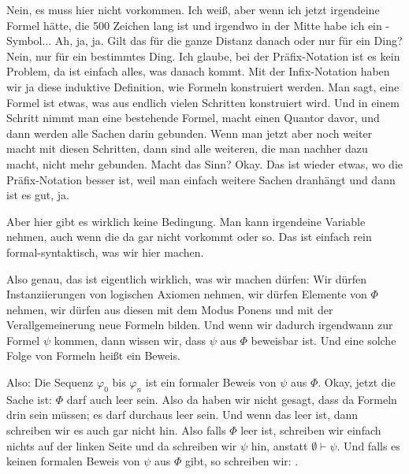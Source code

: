 \begin{spoken-clean}[00:22:30 - 00:24:45]
Nein, es muss hier nicht vorkommen. Ich weiß, aber wenn ich jetzt irgendeine Formel hätte, die 500 Zeichen lang ist und irgendwo in der Mitte habe ich ein -Symbol... Ah, ja, ja. Gilt das für die ganze Distanz danach oder nur für ein Ding? Nein, nur für ein bestimmtes Ding. Ich glaube, bei der Präfix-Notation ist es kein Problem, da ist einfach alles, was danach kommt. Mit der Infix-Notation haben wir ja diese induktive Definition, wie Formeln konstruiert werden. Man sagt, eine Formel ist etwas, was aus endlich vielen Schritten konstruiert wird. Und in einem Schritt nimmt man eine bestehende Formel, macht einen Quantor davor, und dann werden alle Sachen darin gebunden. Wenn man jetzt aber noch weiter macht mit diesen Schritten, dann sind alle weiteren, die man nachher dazu macht, nicht mehr gebunden. Macht das Sinn? Okay. Das ist wieder etwas, wo die Präfix-Notation besser ist, weil man einfach weitere Sachen dranhängt und dann ist es gut, ja.

Aber hier gibt es wirklich keine Bedingung. Man kann irgendeine Variable nehmen, auch wenn die da gar nicht vorkommt oder so. Das ist einfach rein formal-syntaktisch, was wir hier machen.

Also genau, das ist eigentlich wirklich, was wir machen dürfen: Wir dürfen Instanziierungen von logischen Axiomen nehmen, wir dürfen Elemente von $\Phi$ nehmen, wir dürfen aus diesen mit dem Modus Ponens und mit der Verallgemeinerung neue Formeln bilden. Und wenn wir dadurch irgendwann zur Formel $\psi$ kommen, dann wissen wir, dass $\psi$ aus $\Phi$ beweisbar ist. Und eine solche Folge von Formeln heißt ein Beweis.

Also: Die Sequenz $\varphi_0$ bis $\varphi_n$ ist ein formaler Beweis von $\psi$ aus $\Phi$. Okay, jetzt die Sache ist: $\Phi$ darf auch leer sein. Also da haben wir nicht gesagt, dass da Formeln drin sein müssen; es darf durchaus leer sein. Und wenn das leer ist, dann schreiben wir es auch gar nicht hin. Also falls $\Phi$ leer ist, schreiben wir einfach nichts auf der linken Seite und da schreiben wir $\psi$ hin, anstatt $\emptyset \vdash \psi$. Und falls es keinen formalen Beweis von $\psi$ aus $\Phi$ gibt, so schreiben wir: .


\end{spoken-clean}
